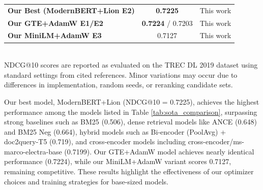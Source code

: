 \documentclass[conference]{IEEEtran}
\begin{document}
\begin{table}[htbp]
\begin{tabular}{l c c}
\midrule
\textbf{Our Best (ModernBERT+Lion E2)} & \textbf{0.7225} & This work \\
\textbf{Our GTE+AdamW E1/E2} & \textbf{0.7224} / 0.7203 & This work \\
\textbf{Our MiniLM+AdamW E3} & 0.7127 & This work \\
\bottomrule
\end{tabular}
\vspace{1em}\\
\footnotesize{NDCG@10 scores are reported as evaluated on the TREC DL 2019 dataset using standard settings from cited references. Minor variations may occur due to differences in implementation, random seeds, or reranking candidate sets.}
\end{table}

Our best model, ModernBERT+Lion (NDCG@10 = 0.7225), achieves the highest performance among the models listed in Table \ref{tab:sota_comparison}, surpassing strong baselines such as BM25 (0.506), dense retrieval models like ANCE (0.648) and BM25 Neg (0.664), hybrid models such as Bi-encoder (PoolAvg) + doc2query-T5 (0.719), and cross-encoder models including cross-encoder/ms-marco-electra-base (0.7199). Our GTE+AdamW model achieves nearly identical performance (0.7224), while our MiniLM+AdamW variant scores 0.7127, remaining competitive. These results highlight the effectiveness of our optimizer choices and training strategies for base-sized models.
\end{document}

